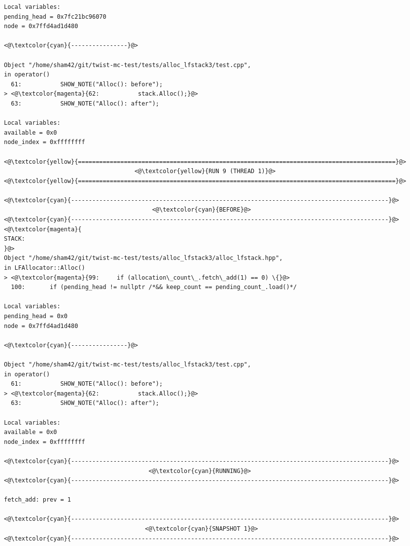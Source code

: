 \begin{adjustwidth}{-3.3cm}{-1cm}
\begin{allintypewriter}
\begin{multicols*}{2}
\begin{lstlisting}[numbers=none]
Local variables: 
pending_head = 0x7fc21bc96070
node = 0x7ffd4ad1d480

<@\textcolor{cyan}{----------------}@>

Object "/home/sham42/git/twist-mc-test/tests/alloc_lfstack3/test.cpp",
in operator()
  61:           SHOW_NOTE("Alloc(): before");
> <@\textcolor{magenta}{62:           stack.Alloc();}@>
  63:           SHOW_NOTE("Alloc(): after");

Local variables: 
available = 0x0
node_index = 0xffffffff

<@\textcolor{yellow}{==========================================================================================}@>
                                     <@\textcolor{yellow}{RUN 9 (THREAD 1)}@>
<@\textcolor{yellow}{==========================================================================================}@>

<@\textcolor{cyan}{------------------------------------------------------------------------------------------}@>
                                          <@\textcolor{cyan}{BEFORE}@>
<@\textcolor{cyan}{------------------------------------------------------------------------------------------}@>
<@\textcolor{magenta}{
STACK:
}@>
Object "/home/sham42/git/twist-mc-test/tests/alloc_lfstack3/alloc_lfstack.hpp",
in LFAllocator::Alloc()
> <@\textcolor{magenta}{99:     if (allocation\_count\_.fetch\_add(1) == 0) \{}@>
  100:       if (pending_head != nullptr /*&& keep_count == pending_count_.load()*/

Local variables: 
pending_head = 0x0
node = 0x7ffd4ad1d480

<@\textcolor{cyan}{----------------}@>

Object "/home/sham42/git/twist-mc-test/tests/alloc_lfstack3/test.cpp",
in operator()
  61:           SHOW_NOTE("Alloc(): before");
> <@\textcolor{magenta}{62:           stack.Alloc();}@>
  63:           SHOW_NOTE("Alloc(): after");

Local variables: 
available = 0x0
node_index = 0xffffffff

<@\textcolor{cyan}{------------------------------------------------------------------------------------------}@>
                                         <@\textcolor{cyan}{RUNNING}@>
<@\textcolor{cyan}{------------------------------------------------------------------------------------------}@>

fetch_add: prev = 1

<@\textcolor{cyan}{------------------------------------------------------------------------------------------}@>
                                        <@\textcolor{cyan}{SNAPSHOT 1}@>
<@\textcolor{cyan}{------------------------------------------------------------------------------------------}@>


\end{lstlisting}
\end{multicols*}
\end{allintypewriter}
\end{adjustwidth}
